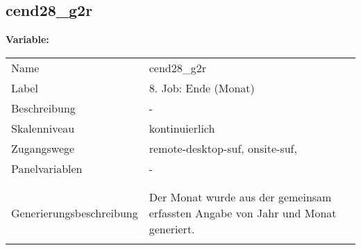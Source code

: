 	
	
	\subsection{cend28\_g2r}
	\label{subSection:cend28_g2r}

	\noindent\textbf{Variable:}\\
		\begin{tabular}{lL{11.3cm}}
			\label{tableVariable:cend28_g2r}
			Name & cend28\_g2r \\
			Label & 8. Job: Ende (Monat) \\
			Beschreibung & - \\
			Skalenniveau & kontinuierlich \\
			Zugangswege &
				remote-desktop-suf,
				onsite-suf,
 \\
			Panelvariablen & -
			 \\
			 \\
 \\
					Generierungsbeschreibung & Der Monat wurde aus der gemeinsam erfassten Angabe von Jahr und Monat generiert. 
				 \\	
			 \\
		\end{tabular}





